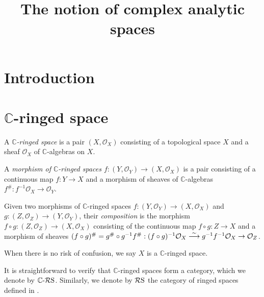 






\title{The notion of complex analytic spaces}







\maketitle


\tableofcontents



\section{Introduction}

\section{\texorpdfstring{$\mathbb{C}$}{C}-ringed space}

\begin{definition}
    A \emph{$\mathbb{C}$-ringed space} is a pair $(X,\mathcal{O}_X)$ consisting of a topological space $X$ and a sheaf $\mathcal{O}_X$ of $\mathbb{C}$-algebras on $X$.

    A \emph{morphism of $\mathbb{C}$-ringed spaces $f:(Y,\mathcal{O}_Y)\rightarrow (X,\mathcal{O}_X)$} is a pair consisting of a continuous map $f:Y\rightarrow X$ and a morphism of sheaves of $\mathbb{C}$-algebras $f^{\#}:f^{-1}\mathcal{O}_X\rightarrow \mathcal{O}_Y$.

    Given two morphisms of $\mathbb{C}$-ringed spaces $f:(Y,\mathcal{O}_Y)\rightarrow (X,\mathcal{O}_X)$ and $g:(Z,\mathcal{O}_Z)\rightarrow (Y,\mathcal{O}_Y)$, their \emph{composition} is the morphism $f\circ g:(Z,\mathcal{O}_Z)\rightarrow (X,\mathcal{O}_X)$ consisting of the continuous map $f\circ g:Z\rightarrow X$ and a morphism of sheaves $(f\circ g)^{\#}=g^{\#}\circ g^{-1}f^{\#}:(f\circ g)^{-1}\mathcal{O}_X\stackrel{\sim}{\longrightarrow} g^{-1}f^{-1}\mathcal{O}_X\rightarrow \mathcal{O}_Z$.

    When there is no risk of confusion, we say $X$ is a $\mathbb{C}$-ringed space.
\end{definition}
It is straightforward to verify that $\mathbb{C}$-ringed spaces form a category, which we denote by $\mathbb{C}\text{-}\mathcal{R}\mathrm{S}$.
Similarly, we denote by $\mathcal{R}\mathrm{S}$ the category of ringed spaces defined in \cite[\href{https://stacks.math.columbia.edu/tag/0090}{Tag 0090}]{stacks-project}.

